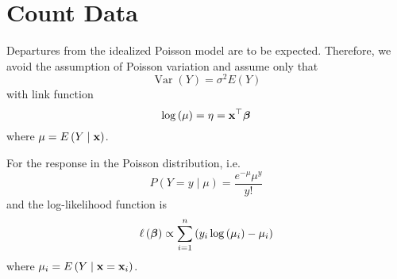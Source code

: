 \section{Count Data}

Departures from the idealized Poisson model are to be expected. Therefore, we avoid the assumption of Poisson variation and assume only that
\begin{equation}
	\operatorname{Var}\left(Y\right)=\sigma^{2}E\left(Y\right)
\end{equation}
with link function
\begin{equation}
	\log\left(\mu\right)=\eta={\bf x}^{\top}\boldsymbol{\beta}
\end{equation}
where $\mu=E\left(Y\mid{\bf x}\right)$.

For the response in the Poisson distribution, i.e.
\begin{equation*}
	P(Y=y\mid\mu)=\frac{e^{-\mu}\mu^{y}}{y!}
\end{equation*}
and the log-likelihood function is
\begin{equation}
	\ell\left(\boldsymbol{\beta}\right)\propto\sum_{i=1}^{n}\left(y_{i} \log\left(\mu_{i}\right)-\mu_{i}\right)
\end{equation}
where $\mu_{i}=E\left(Y\mid{\bf x}={\bf x}_{i}\right)$.
